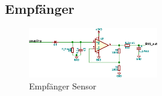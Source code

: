 
\subsection{Empf\"anger}
\label{subsec:hw:sensor:receiver}

\begin{figure}[h!t]
    \centering
    \includegraphics[width=0.5\textwidth]{images/sensor-sch/sensor--sch--receiver.eps}
    \caption[Sensor: Schema Empf\"anger]{Empf\"anger Sensor}
\end{figure}


